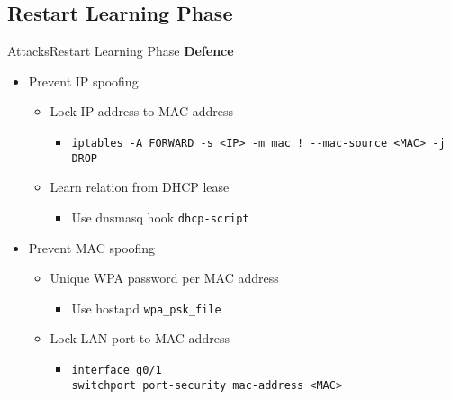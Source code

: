 \subsection{Restart Learning Phase}
\begin{frame}{Attacks}{Restart Learning Phase}
\textbf{Defence}
\begin{itemize}
	\item Prevent IP spoofing
	\begin{itemize}
		\item Lock IP address to MAC address
		\begin{itemize}
			\item \texttt{iptables -A FORWARD -s <IP> -m mac ! -{}-mac-source <MAC> -j DROP}
		\end{itemize}
		\item Learn relation from DHCP lease
		\begin{itemize}
			\item Use dnsmasq hook \texttt{dhcp-script}
		\end{itemize}
	\end{itemize}
	\item Prevent MAC spoofing
	\begin{itemize}
		\item Unique WPA password per MAC address
		\begin{itemize}
			\item Use hostapd \texttt{wpa\_psk\_file}
		\end{itemize}
		\item Lock LAN port to MAC address
		\begin{itemize}
			\item \texttt{interface g0/1 \\ switchport port-security mac-address <MAC>} 
		\end{itemize}
	\end{itemize}
\end{itemize}	
\end{frame}
